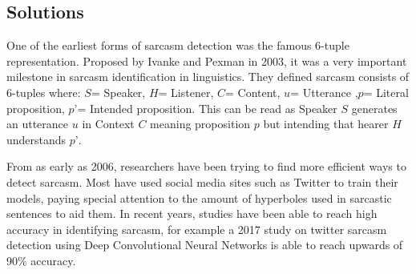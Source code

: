 \documentclass{article}
\begin{document}
	\subsection{Solutions}
	
	One of the earliest forms of sarcasm detection was the famous 6-tuple representation. Proposed by Ivanke and Pexman \cite{stacey} in 2003, it was a very important milestone in sarcasm identification in linguistics. They defined sarcasm consists of 6-tuples where: $S$= Speaker, $H$= Listener, $C$= Content, $u$= Utterance ,$p$= Literal proposition, $p’$= Intended proposition. This can be read as Speaker $S$ generates an utterance $u$ in Context $C$ meaning proposition $p$ but intending that hearer $H$ understands $p’$. \par
	
	From as early as 2006\cite{tepperman}, researchers have been trying to find more efficient ways to detect sarcasm. Most have used social media sites such as Twitter to train their models\cite{dmitry}, paying special attention to the amount of hyperboles used in sarcastic sentences to aid them. In recent years, studies have been able to reach high accuracy in identifying sarcasm, for example a 2017 study on twitter sarcasm detection using Deep Convolutional Neural Networks\cite{shelly} is able to reach upwards of 90\% accuracy.
	
	\printbibliography
	
	
\end{document}
